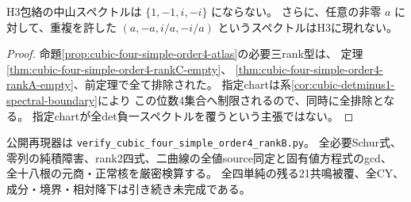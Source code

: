 \begin{corollary}
\label{cor:cubic-four-simple-order4-empty}
H3包絡の中山スペクトルは $\{1,-1,i,-i\}$ にならない。
さらに、任意の非零 $a$ に対して、重複を許した
$(a,-a,i/a,-i/a)$ というスペクトルはH3に現れない。
\end{corollary}
\begin{proof}
命題\ref{prop:cubic-four-simple-order4-atlas}の必要三rank型は、
定理\ref{thm:cubic-four-simple-order4-rankC-empty}、
\ref{thm:cubic-four-simple-order4-rankA-empty}、前定理で全て排除された。
指定chartは系\ref{cor:cubic-detminus1-spectral-boundary}により
この位数4集合へ制限されるので、同時に全排除となる。
指定chartが全det負一スペクトルを覆うという主張ではない。
\end{proof}

公開再現器は \texttt{verify\_cubic\_four\_simple\_order4\_rankB.py}。
全必要Schur式、零列の純積障害、rank2四式、二曲線の全値source同定と固有値方程式のgcd、
全十八根の元商・正常核を厳密検算する。
全四単純の残る21共鳴被覆、全CY、成分・境界・相対降下は引き続き未完成である。
